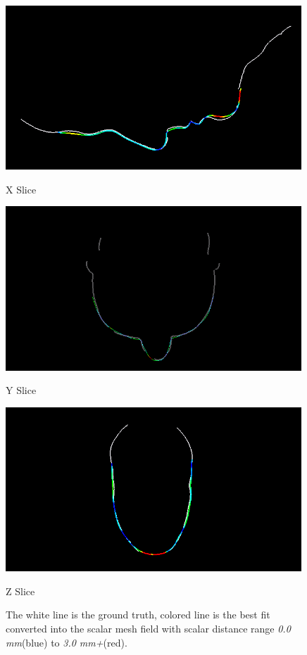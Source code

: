 \begin{figure}
  \centering    
  \begin{minipage}{.325\textwidth}
    \centering
    \includegraphics[width=0.99\textwidth]{Figures/Pictures/gtX.png}
    \caption*{X Slice}
  \end{minipage}
  \begin{minipage}{.325\textwidth}
    \centering
    \includegraphics[width=0.99\textwidth]{Figures/Pictures/gtY.png}
    \caption*{Y Slice}
  \end{minipage}
  \begin{minipage}{.325\textwidth}
    \centering
    \includegraphics[width=0.99\textwidth]{Figures/Pictures/gtZ.png}
    \caption*{Z Slice}
  \end{minipage}
  \caption{The white line is the ground truth, colored line is the best fit converted into the scalar mesh field with scalar distance range \textit{0.0 mm}(blue) to \textit{3.0 mm+}(red).}
  \label{f3.16}
\end{figure}
